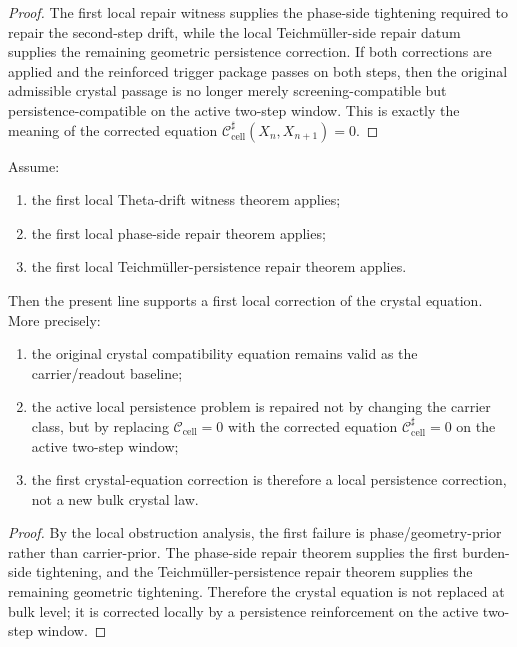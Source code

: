 \begin{proof}
The first local repair witness supplies the phase-side tightening required to repair the second-step drift, while the local Teichmüller-side repair datum supplies the remaining geometric persistence correction. If both corrections are applied and the reinforced trigger package passes on both steps, then the original admissible crystal passage is no longer merely screening-compatible but persistence-compatible on the active two-step window. This is exactly the meaning of the corrected equation $\mathcal C_{\mathrm{cell}}^{\sharp}(X_n,X_{n+1})=0$.
\end{proof}

\begin{theorem}
\label{thm:first-local-crystal-equation-correction-theorem}
Assume:
\begin{enumerate}[leftmargin=2em,label=(\roman*)]
 \item the first local Theta-drift witness theorem applies;
 \item the first local phase-side repair theorem applies;
 \item the first local Teichmüller-persistence repair theorem applies.
\end{enumerate}
Then the present line supports a first local correction of the crystal equation.
More precisely:
\begin{enumerate}[leftmargin=2em,label=(\alph*)]
 \item the original crystal compatibility equation remains valid as the carrier/readout baseline;
 \item the active local persistence problem is repaired not by changing the carrier class, but by replacing $\mathcal C_{\mathrm{cell}}=0$ with the corrected equation $\mathcal C_{\mathrm{cell}}^{\sharp}=0$ on the active two-step window;
 \item the first crystal-equation correction is therefore a local persistence correction, not a new bulk crystal law.
\end{enumerate}
\end{theorem}

\begin{proof}
By the local obstruction analysis, the first failure is phase/geometry-prior rather than carrier-prior. The phase-side repair theorem supplies the first burden-side tightening, and the Teichmüller-persistence repair theorem supplies the remaining geometric tightening. Therefore the crystal equation is not replaced at bulk level; it is corrected locally by a persistence reinforcement on the active two-step window.
\end{proof}

